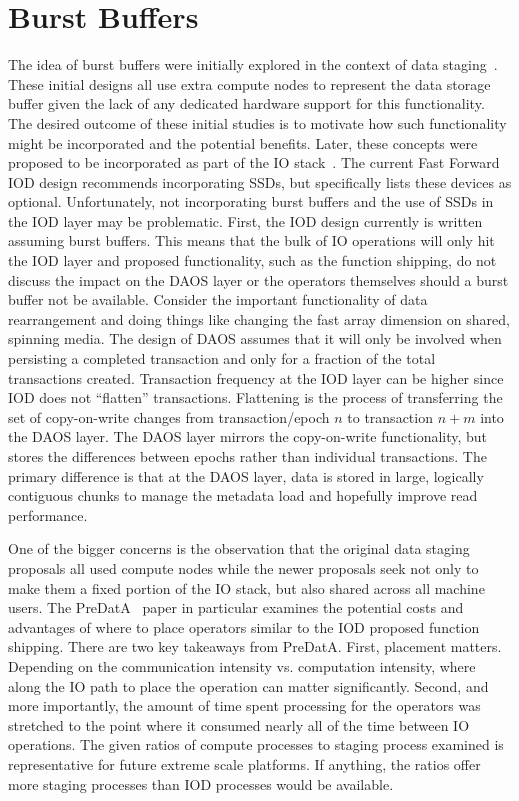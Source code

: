 \documentclass[conference]{IEEEtran}
\begin{document}
\section{Burst Buffers}
\label{sec:burst}

The idea of burst buffers were initially explored in the context of data
staging~\cite{abbasi:2007:datatap,Abbasi:2009:datatap,nisar:2008:staging,zheng:2010:predata}.
These initial designs all use extra compute nodes to represent the data storage
buffer given the lack of any dedicated hardware support for this functionality.
The desired outcome of these initial studies is to motivate how such
functionality might be incorporated and the potential benefits.  Later, these
concepts were proposed to be incorporated as part of the IO
stack~\cite{nowoczynski:2008:zest,bent:2012:challenges,bent:2012:burst-buffer}.
The current Fast Forward IOD design recommends incorporating SSDs, but
specifically lists these devices as optional. Unfortunately, not incorporating
burst buffers and the use of SSDs in the IOD layer may be problematic.  First,
the IOD design currently is written assuming burst buffers. This means that the
bulk of IO operations will only hit the IOD layer and proposed functionality,
such as the function shipping, do not discuss the impact on the DAOS layer or
the operators themselves should a burst buffer not be available.  Consider the
important functionality of data rearrangement and doing things like changing
the fast array dimension on shared, spinning media.  The design of DAOS assumes
that it will only be involved when persisting a completed transaction and only
for a fraction of the total transactions created.  Transaction frequency at the
IOD layer can be higher since IOD does not ``flatten'' transactions. Flattening
is the process of transferring the set of copy-on-write changes from
transaction/epoch $n$ to transaction $n+m$ into the DAOS layer. The DAOS layer
mirrors the copy-on-write functionality, but stores the differences between
epochs rather than individual transactions. The primary difference is that at
the DAOS layer, data is stored in large, logically contiguous chunks to manage
the metadata load and hopefully improve read performance.

One of the bigger concerns is the observation that the original data staging
proposals all used compute nodes while the newer proposals seek not only to
make them a fixed portion of the IO stack, but also shared across all machine
users. The PreDatA~\cite{zheng:2010:predata} paper in particular examines the
potential costs and advantages of where to place operators similar to the IOD
proposed function shipping. There are two key takeaways from PreDatA. First,
placement matters.  Depending on the communication intensity vs. computation
intensity, where along the IO path to place the operation can matter
significantly. Second, and more importantly, the amount of time spent
processing for the operators was stretched to the point where it consumed
nearly all of the time between IO operations. The given ratios of compute
processes to staging process examined is representative for future extreme
scale platforms. If anything, the ratios offer more staging processes than IOD
processes would be available.
\end{document}
